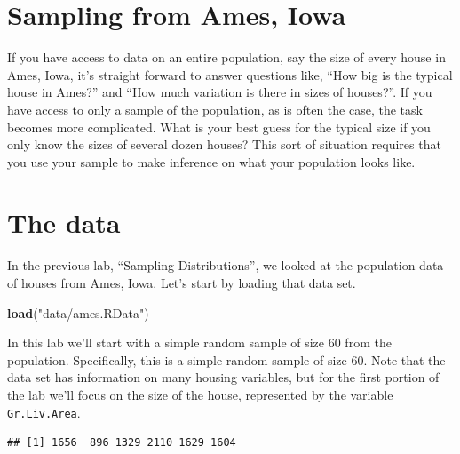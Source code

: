 \documentclass[]{book}
\newenvironment{Shaded}{\begin{snugshade}}{\end{snugshade}}
\newcommand{\KeywordTok}[1]{\textcolor[rgb]{0.13,0.29,0.53}{\textbf{{#1}}}}
\newcommand{\StringTok}[1]{\textcolor[rgb]{0.31,0.60,0.02}{{#1}}}
\newcommand{\NormalTok}[1]{{#1}}
\theoremstyle{definition}
\theoremstyle{definition}
\theoremstyle{remark}
\begin{document}
\section*{Sampling from Ames, Iowa}\label{sampling-from-ames-iowa}

If you have access to data on an entire population, say the size of
every house in Ames, Iowa, it's straight forward to answer questions
like, ``How big is the typical house in Ames?'' and ``How much variation
is there in sizes of houses?''. If you have access to only a sample of
the population, as is often the case, the task becomes more complicated.
What is your best guess for the typical size if you only know the sizes
of several dozen houses? This sort of situation requires that you use
your sample to make inference on what your population looks like.

\section*{The data}\label{the-data-2}

In the previous lab, ``Sampling Distributions'', we looked at the
population data of houses from Ames, Iowa. Let's start by loading that
data set.

\begin{Shaded}
\begin{Highlighting}[]
\KeywordTok{load}\NormalTok{(}\StringTok{"data/ames.RData"}\NormalTok{)}
\end{Highlighting}
\end{Shaded}

In this lab we'll start with a simple random sample of size 60 from the
population. Specifically, this is a simple random sample of size 60.
Note that the data set has information on many housing variables, but
for the first portion of the lab we'll focus on the size of the house,
represented by the variable \texttt{Gr.Liv.Area}.

\begin{Shaded}
\end{Shaded}

\begin{verbatim}
## [1] 1656  896 1329 2110 1629 1604
\end{verbatim}
\end{document}

